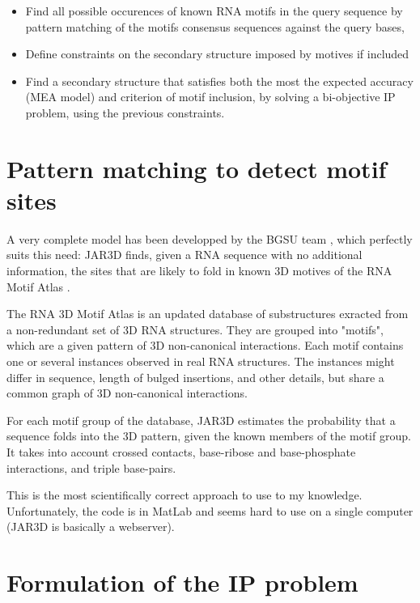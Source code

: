 \documentclass{article}
\begin{document}
\begin{itemize}
	\item Find all possible occurences of known RNA motifs in the query sequence by pattern matching of the motifs consensus sequences against the query bases,
	\item Define constraints on the secondary structure imposed by motives if included
	\item Find a secondary structure that satisfies both the most the expected accuracy (MEA model) and criterion of motif inclusion, by solving a bi-objective IP problem, using the previous constraints.
\end{itemize}

\newpage
\section{Pattern matching to detect motif sites}
A very complete model has been developped by the BGSU team \cite{zirbel_identifying_2015}, 
which perfectly suits this need: JAR3D finds, given a RNA sequence with no additional information, 
the sites that are likely to fold in known 3D motives of the RNA Motif Atlas \cite{petrov_automated_2013}.

The RNA 3D Motif Atlas is an updated database of substructures exracted from a non-redundant set of 3D RNA structures. They are grouped into "motifs", which are a given pattern of 3D non-canonical interactions.
Each motif contains one or several instances observed in real RNA structures. 
The instances might differ in sequence, length of bulged insertions, and other details, but share a common graph of 3D non-canonical interactions.

For each motif group of the database, JAR3D estimates the probability that a sequence folds into the 3D pattern, given the known members of the motif group. It takes into account crossed contacts, base-ribose and base-phosphate interactions, and triple base-pairs.

This is the most scientifically correct approach to use to my knowledge. Unfortunately, the code is in MatLab and seems hard to use on a single computer (JAR3D is basically a webserver).

\section{Formulation of the IP problem}
	
\end{document}
